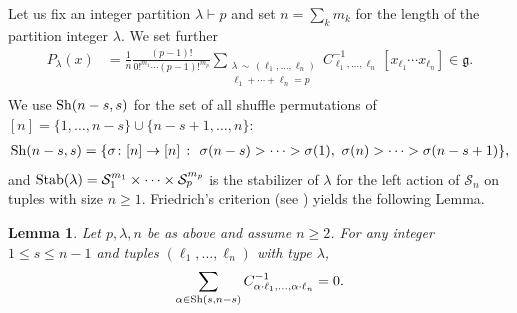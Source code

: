 \documentclass[12pt]{article}
\newtheorem{lemma}[theorem]{Lemma}
\begin{document}
Let us fix an integer partition $\lambda \vdash p$ and set $n = \sum_k m_k$ for the length of the partition integer $\lambda$. We set further
\begin{align}
\label{eqn:pl}
P_{\lambda}(x)&= \frac{1}{n}\frac{(p-1)!}{0!^{m_1}\cdots (p-1)!^{m_p}} \sum_{\substack{\lambda \,\sim\, (\ell_1,\ldots,\ell_n) \\ \ell_1 + \cdots + \ell_{n} = p \\ }} {C^{-1}_{\ell_1,\ldots,\ell_n}}\,[x_{\ell_1} \cdots x_{\ell_{n}}] \in {\mathfrak{g}}.
\end{align}
We use ${\rm Sh}(n-s,s)$ for the set of all shuffle permutations of $[n] = \{1,\ldots,n-s\}\cup \{n-s+1,\ldots,n\}$: 
\begin{align}
{\rm Sh}(n-s,s) = \{ \sigma\colon [n]\to [n] ~\colon~ \sigma(n-s) > \cdots > \sigma(1), ~  \sigma(n) > \cdots > \sigma(n-s+1) \} , 
\end{align}
and ${\rm Stab}(\lambda) = \mathcal{S}_{1}^{m_1}\times \cdots \times \mathcal{S}_{p}^{m_p}$ is the stabilizer of $\lambda$ for the left action of $\mathcal{S}_n$ on tuples with size $n\geq 1$.
Friedrich's criterion (see \cite{Re}) yields the following Lemma. 
\begin{lemma}\label{lem:friedrich}
Let $p,\lambda,n$ be as above and assume $n\geq 2$. For any integer $1\leq s \leq n-1$ and tuples $(\ell_1,\ldots,\ell_n)$ with type $\lambda$, 
\begin{equation}
\label{eqn:friedrichcriterion}
\sum_{\alpha \in {\rm Sh}(s,n-s)} C^{-1}_{\alpha\cdot\ell_1,\ldots,\alpha\cdot\ell_n}=0.
\end{equation}
\end{lemma}
\end{document}
